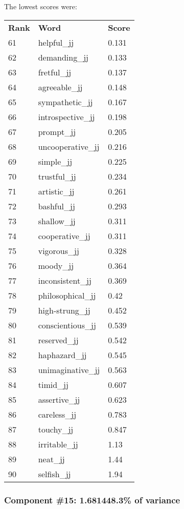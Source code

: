\documentclass[10pt,letterpaper]{book}
\begin{document}
The lowest scores were:
\begin{tabular}{ l l l }
        \textbf{Rank} & \textbf{Word} & \textbf{Score} \\
        61 & helpful\_jj & 0.131 \\
        62 & demanding\_jj & 0.133 \\
        63 & fretful\_jj & 0.137 \\
        64 & agreeable\_jj & 0.148 \\
        65 & sympathetic\_jj & 0.167 \\
        66 & introspective\_jj & 0.198 \\
        67 & prompt\_jj & 0.205 \\
        68 & uncooperative\_jj & 0.216 \\
        69 & simple\_jj & 0.225 \\
        70 & trustful\_jj & 0.234 \\
        71 & artistic\_jj & 0.261 \\
        72 & bashful\_jj & 0.293 \\
        73 & shallow\_jj & 0.311 \\
        74 & cooperative\_jj & 0.311 \\
        75 & vigorous\_jj & 0.328 \\
        76 & moody\_jj & 0.364 \\
        77 & inconsistent\_jj & 0.369 \\
        78 & philosophical\_jj & 0.42 \\
        79 & high-strung\_jj & 0.452 \\
        80 & conscientious\_jj & 0.539 \\
        81 & reserved\_jj & 0.542 \\
        82 & haphazard\_jj & 0.545 \\
        83 & unimaginative\_jj & 0.563 \\
        84 & timid\_jj & 0.607 \\
        85 & assertive\_jj & 0.623 \\
        86 & careless\_jj & 0.783 \\
        87 & touchy\_jj & 0.847 \\
        88 & irritable\_jj & 1.13 \\
        89 & neat\_jj & 1.44 \\
        90 & selfish\_jj & 1.94 \\
\end{tabular}
\subsubsection{Component \#15: 1.681448.3\% of variance}
\end{document}
